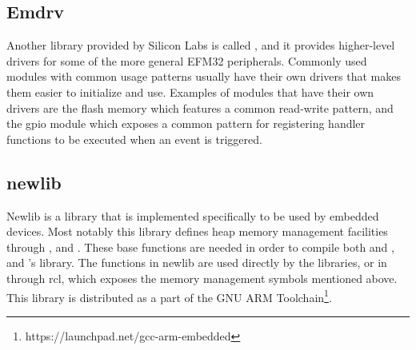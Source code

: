 \subsection{Emdrv}

Another library provided by Silicon Labs is called , and it provides higher-level drivers for some of the more general EFM32 peripherals.
Commonly used modules with common usage patterns usually have their own drivers that makes them easier to initialize and use.
Examples of modules that have their own drivers are the flash memory which features a common read-write pattern, and the \gls{gpio} module which exposes a common pattern for registering handler functions to be executed when an event is triggered.

\subsection{newlib}

Newlib is a {\C} library that is implemented specifically to be used by embedded devices.
Most notably this library defines heap memory management facilities through ,  and .
These base functions are needed in order to compile both {\emlib} and , and {\rust}'s  library.
The functions in newlib are used directly by the {\C} libraries, or in {\rust} through \gls{rcl}, which exposes the memory management symbols mentioned above.
This library is distributed as a part of the GNU ARM Toolchain\footnote{https://launchpad.net/gcc-arm-embedded}.
